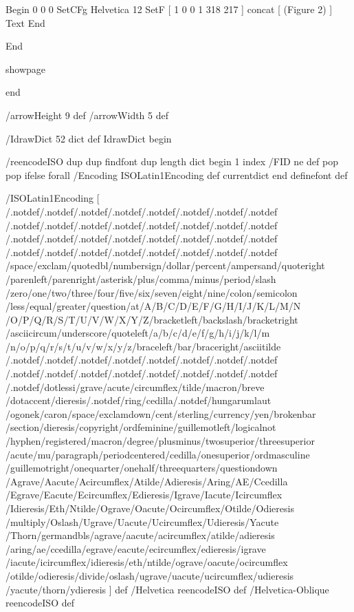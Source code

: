 Begin %
0 0 0 SetCFg
Helvetica 12 SetF
[ 1 0 0 1 318 217 ] concat
[
(Figure 2)
] Text
End

End %

showpage


end



/arrowHeight 9 def
/arrowWidth 5 def

/IdrawDict 52 dict def
IdrawDict begin

/reencodeISO {
dup dup findfont dup length dict begin
{ 1 index /FID ne { def }{ pop pop } ifelse } forall
/Encoding ISOLatin1Encoding def
currentdict end definefont
} def

/ISOLatin1Encoding [
/.notdef/.notdef/.notdef/.notdef/.notdef/.notdef/.notdef/.notdef
/.notdef/.notdef/.notdef/.notdef/.notdef/.notdef/.notdef/.notdef
/.notdef/.notdef/.notdef/.notdef/.notdef/.notdef/.notdef/.notdef
/.notdef/.notdef/.notdef/.notdef/.notdef/.notdef/.notdef/.notdef
/space/exclam/quotedbl/numbersign/dollar/percent/ampersand/quoteright
/parenleft/parenright/asterisk/plus/comma/minus/period/slash
/zero/one/two/three/four/five/six/seven/eight/nine/colon/semicolon
/less/equal/greater/question/at/A/B/C/D/E/F/G/H/I/J/K/L/M/N
/O/P/Q/R/S/T/U/V/W/X/Y/Z/bracketleft/backslash/bracketright
/asciicircum/underscore/quoteleft/a/b/c/d/e/f/g/h/i/j/k/l/m
/n/o/p/q/r/s/t/u/v/w/x/y/z/braceleft/bar/braceright/asciitilde
/.notdef/.notdef/.notdef/.notdef/.notdef/.notdef/.notdef/.notdef
/.notdef/.notdef/.notdef/.notdef/.notdef/.notdef/.notdef/.notdef
/.notdef/dotlessi/grave/acute/circumflex/tilde/macron/breve
/dotaccent/dieresis/.notdef/ring/cedilla/.notdef/hungarumlaut
/ogonek/caron/space/exclamdown/cent/sterling/currency/yen/brokenbar
/section/dieresis/copyright/ordfeminine/guillemotleft/logicalnot
/hyphen/registered/macron/degree/plusminus/twosuperior/threesuperior
/acute/mu/paragraph/periodcentered/cedilla/onesuperior/ordmasculine
/guillemotright/onequarter/onehalf/threequarters/questiondown
/Agrave/Aacute/Acircumflex/Atilde/Adieresis/Aring/AE/Ccedilla
/Egrave/Eacute/Ecircumflex/Edieresis/Igrave/Iacute/Icircumflex
/Idieresis/Eth/Ntilde/Ograve/Oacute/Ocircumflex/Otilde/Odieresis
/multiply/Oslash/Ugrave/Uacute/Ucircumflex/Udieresis/Yacute
/Thorn/germandbls/agrave/aacute/acircumflex/atilde/adieresis
/aring/ae/ccedilla/egrave/eacute/ecircumflex/edieresis/igrave
/iacute/icircumflex/idieresis/eth/ntilde/ograve/oacute/ocircumflex
/otilde/odieresis/divide/oslash/ugrave/uacute/ucircumflex/udieresis
/yacute/thorn/ydieresis
] def
/Helvetica reencodeISO def
/Helvetica-Oblique reencodeISO def

